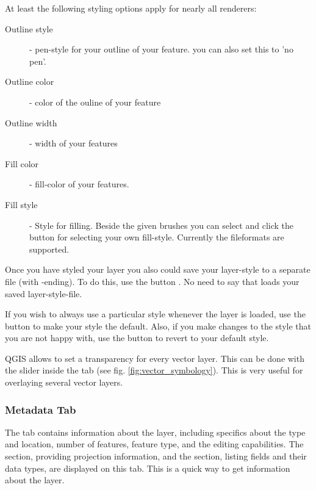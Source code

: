 At least the following styling options apply for nearly all renderers:
\begin{description}
 \item[Outline style] - pen-style for your outline of your feature. you can
 also set this to 'no pen'.
 \item[Outline color] - color of the ouline of your feature
 \item[Outline width] - width of your features
 \item[Fill color] - fill-color of your features.
 \item[Fill style] - Style for filling. Beside the given brushes you can
 select  and click the \browsebutton
 button for selecting your own fill-style. Currently the fileformats
  are supported.
\end{description}

Once you have styled your layer you also could save your layer-style to a
separate file (with -ending).
To do this, use the button . No need to say that
 loads your saved layer-style-file.

If you wish to always use a particular style whenever the layer is loaded, 
use the  button to make your style the default. Also, 
if you make changes to the style that you are not happy with, use the  button to revert to your default style.

 \label{sec:vect_transparency} 
QGIS \CURRENT allows to set a transparency for every vector layer. This can be done with
the slider  inside the  tab (see fig. \ref{fig:vector_symbology}).
This is very useful for overlaying several vector layers.

\subsubsection{Metadata Tab}

The  tab contains information about the layer, including specifics
about the type and location, number of features, feature type, and the editing
capabilities. The  section, providing 
projection information, and the  section,
listing fields and their data types, are displayed 
on this tab. This is a quick way to get information about the layer.

